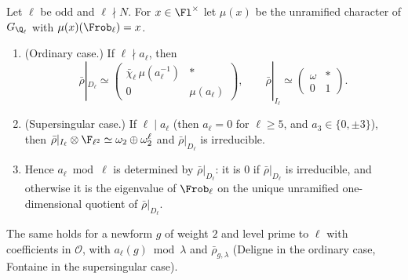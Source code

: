\begin{theorem}\label{thm:galrep:deligne-fontaine}
Let $\ell$ be odd and $\ell\nmid N$. For $x\in\Fl^\times$ let $\mu(x)$ be the unramified character of $G_{\Q_\ell}$ with $\mu(x)(\Frob_\ell)=x$.
\begin{enumerate}[label=(\roman*)]
\item (Ordinary case.) If $\ell\nmid a_\ell$, then
\[
\bar\rho|_{D_\ell}\simeq\begin{pmatrix}\bar\chi_\ell\,\mu(a_\ell^{-1})&*\\0&\mu(a_\ell)\end{pmatrix},\qquad\bar\rho|_{I_\ell}\simeq\begin{pmatrix}\omega&*\\0&1\end{pmatrix}.
\]
\item (Supersingular case.) If $\ell\mid a_\ell$ (then $a_\ell=0$ for $\ell\ge5$, and $a_3\in\{0,\pm3\}$), then $\bar\rho|_{I_\ell}\otimes\F_{\ell^2}\simeq\omega_2\oplus\omega_2^\ell$ and
$\bar\rho|_{D_\ell}$ is irreducible.
\item Hence $a_\ell\bmod\ell$ is determined by $\bar\rho|_{D_\ell}$: it is $0$ if $\bar\rho|_{D_\ell}$ is irreducible, and otherwise it is the eigenvalue of $\Frob_\ell$ on
the unique unramified one-dimensional quotient of $\bar\rho|_{D_\ell}$.
\end{enumerate}
The same holds for a newform $g$ of weight $2$ and level prime to $\ell$ with coefficients in $\mathcal O$, with $a_\ell(g)\bmod\lambda$ and
$\bar\rho_{g,\lambda}$ (Deligne in the ordinary case, Fontaine in the supersingular case).
\end{theorem}

